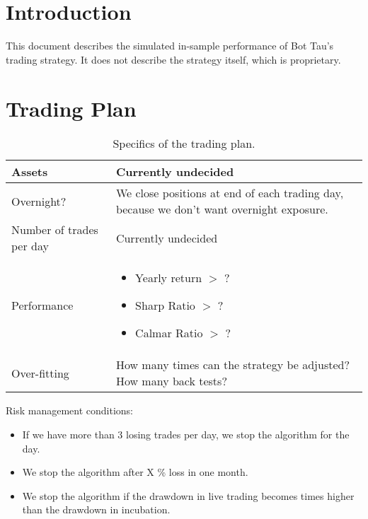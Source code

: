 \documentclass[a4paper]{article}
\title{\documenttitle}
\date{\today}
\author{\name \\
        \href{mailto:fenglich@fastmail.fm}{fenglich@fastmail.fm}}
\begin{document}
\maketitle

\tableofcontents

\section{Introduction}

This document describes the simulated in-sample performance of Bot Tau's trading
strategy. It does not describe the strategy itself, which is proprietary.

\section{Trading Plan}

\begin{table}[H]
\begin{center}
\caption{Specifics of the trading plan.}
    \begin{tabular}{|l|p{4in}|}
        \hline
        Assets              & Currently undecided \\
        \hline
        Overnight?          & We close positions at end of each trading day, because we don't want overnight exposure. \\
        \hline
        Number of trades per day  &  Currently undecided \\
        \hline
        Performance         &   \begin{itemize}
                                    \item Yearly return $>$ ?
                                    \item Sharp Ratio $>$ ?
                                    \item Calmar Ratio $>$  ?
                                \end{itemize} \\
        \hline
        Over-fitting        & How many times can the strategy be adjusted? How many back tests? \\
        \hline
    \end{tabular}
\end{center}
\end{table}

Risk management conditions:

\begin{itemize}
    \item If we have more than 3 losing trades per day, we stop the algorithm
          for the day.
    \item We stop the algorithm after X \% loss in one month.
    \item We stop the algorithm if the drawdown in live trading becomes  times
          higher than the drawdown in incubation.
\end{itemize}
\end{document}
